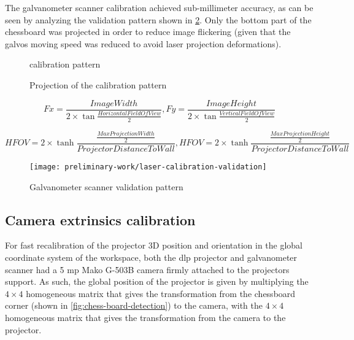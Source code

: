 The galvanometer scanner calibration achieved sub-millimeter accuracy, as can be seen by analyzing the validation pattern shown in \cref{fig:laser-calibration-validation}. Only the bottom part of the chessboard was projected in order to reduce image flickering (given that the galvos moving speed was reduced to avoid laser projection deformations).

\begin{figure}[H]
	\begin{floatrow}[2]
		{\caption{ calibration pattern}\label{fig:laser-ilda-calibration-pattern}}
		{\caption[Projection of the  calibration pattern]{Projection of the  calibration pattern\protect\footnotemark}\label{fig:laser-ilda-calibration-pattern-projected}}
	\end{floatrow}
\end{figure}

\begin{equation}\label{eq:intrinsics-focal-lenghts}
	Fx = \frac{\scriptstyle ImageWidth}{2 \times \tan \frac{HorizontalFieldOfView}{2}},
	Fy = \frac{\scriptstyle ImageHeight}{2 \times \tan \frac{VerticalFieldOfView}{2}}
\end{equation}

\begin{equation}\label{eq:intrinsics-field-of-view}
	HFOV = 2 \times \tanh \frac{\frac{MaxProjectionWidth}{2}}{\scriptstyle ProjectorDistanceToWall},
	HFOV = 2 \times \tanh \frac{\frac{MaxProjectionHeight}{2}}{\scriptstyle ProjectorDistanceToWall}
\end{equation}

\begin{figure}[H]
	\centering
	\texttt{[image: preliminary-work/laser-calibration-validation]}
	\caption{Galvanometer scanner validation pattern}
	\label{fig:laser-calibration-validation}
\end{figure}


\subsection{Camera extrinsics calibration}

For fast recalibration of the projector 3D position and orientation in the global coordinate system of the workspace, both the \gls{dlp} projector and galvanometer scanner had a 5 \gls{mp} Mako G-503B camera firmly attached to the projectors support. As such, the global position of the projector is given by multiplying the $4 \times 4$ homogeneous matrix that gives the transformation from the chessboard corner (shown in \cref{fig:chess-board-detection}) to the camera, with the $4 \times 4$ homogeneous matrix that gives the transformation from the camera to the projector.


